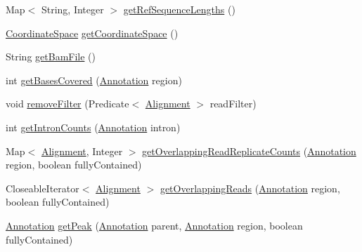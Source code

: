 \begin{DoxyCompactItemize}
Map$<$ String, Integer $>$ \hyperlink{classumms_1_1core_1_1model_1_1_j_c_s_alignment_model_a3669cfd3c08b28363c1dabe962489d49}{get\+Ref\+Sequence\+Lengths} ()
\item 
\hyperlink{interfaceumms_1_1core_1_1coordinatesystem_1_1_coordinate_space}{Coordinate\+Space} \hyperlink{classumms_1_1core_1_1model_1_1_j_c_s_alignment_model_aca51c172563488f6435e1cb096922c63}{get\+Coordinate\+Space} ()
\item 
String \hyperlink{classumms_1_1core_1_1model_1_1_j_c_s_alignment_model_a28738b736bcc5e5248ea58c39477a6c4}{get\+Bam\+File} ()
\item 
int \hyperlink{classumms_1_1core_1_1model_1_1_j_c_s_alignment_model_adb5028799b1713ae9d48a8dd64e3ec7c}{get\+Bases\+Covered} (\hyperlink{interfaceumms_1_1core_1_1annotation_1_1_annotation}{Annotation} region)
\item 
void \hyperlink{classumms_1_1core_1_1model_1_1_j_c_s_alignment_model_ab8fe2f798ebd01f580f084acd2b532aa}{remove\+Filter} (Predicate$<$ \hyperlink{interfaceumms_1_1core_1_1alignment_1_1_alignment}{Alignment} $>$ read\+Filter)
\item 
int \hyperlink{classumms_1_1core_1_1model_1_1_j_c_s_alignment_model_a1d436b8676a6d0003d8dd57a4b73ed4b}{get\+Intron\+Counts} (\hyperlink{interfaceumms_1_1core_1_1annotation_1_1_annotation}{Annotation} intron)
\item 
Map$<$ \hyperlink{interfaceumms_1_1core_1_1alignment_1_1_alignment}{Alignment}, Integer $>$ \hyperlink{classumms_1_1core_1_1model_1_1_j_c_s_alignment_model_ac6831a54e791f8a59207c387ebda79cc}{get\+Overlapping\+Read\+Replicate\+Counts} (\hyperlink{interfaceumms_1_1core_1_1annotation_1_1_annotation}{Annotation} region, boolean fully\+Contained)
\item 
Closeable\+Iterator$<$ \hyperlink{interfaceumms_1_1core_1_1alignment_1_1_alignment}{Alignment} $>$ \hyperlink{classumms_1_1core_1_1model_1_1_j_c_s_alignment_model_add9b428e55a7f0a7619a08726b4acad5}{get\+Overlapping\+Reads} (\hyperlink{interfaceumms_1_1core_1_1annotation_1_1_annotation}{Annotation} region, boolean fully\+Contained)
\item 
\hyperlink{interfaceumms_1_1core_1_1annotation_1_1_annotation}{Annotation} \hyperlink{classumms_1_1core_1_1model_1_1_j_c_s_alignment_model_ace2f29aff75114c5a3cb64c867781006}{get\+Peak} (\hyperlink{interfaceumms_1_1core_1_1annotation_1_1_annotation}{Annotation} parent, \hyperlink{interfaceumms_1_1core_1_1annotation_1_1_annotation}{Annotation} region, boolean fully\+Contained)
\item 

\end{DoxyCompactItemize}
